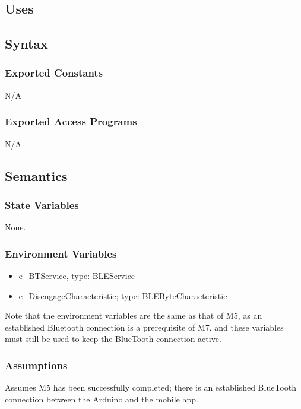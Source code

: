 \documentclass[12pt, titlepage]{article}
\begin{document}
\subsection{Uses}

\subsection{Syntax}

\subsubsection{Exported Constants}

N/A

\subsubsection{Exported Access Programs}

N/A

\subsection{Semantics}

\subsubsection{State Variables}

None.

\subsubsection{Environment Variables}

\begin{itemize}
\item e\_BTService, type: BLEService
\item e\_DisengageCharacteristic; type: BLEByteCharacteristic
\end{itemize}

Note that the environment variables are the same as that of M5, as an established Bluetooth connection is a prerequisite of M7, and these variables must still be used to keep the BlueTooth connection active. 

\subsubsection{Assumptions}

Assumes M5 has been successfully completed; there is an established BlueTooth connection between the Arduino and the mobile app.
\end{document}
